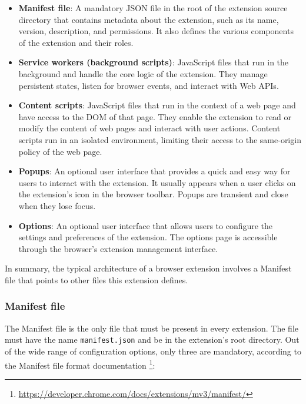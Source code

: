 \begin{itemize}
	\item \textbf{Manifest file}: A mandatory JSON file in the root of the extension source directory that contains metadata about the extension, such as its name, version, description, and permissions. It also defines the various components of the extension and their roles.
	\item \textbf{Service workers (background scripts)}: JavaScript files that run in the background and handle the core logic of the extension. They manage persistent states, listen for browser events, and interact with Web APIs.
	\item \textbf{Content scripts}: JavaScript files that run in the context of a web page and have access to the DOM of that page. They enable the extension to read or modify the content of web pages and interact with user actions. Content scripts run in an isolated environment, limiting their access to the same-origin policy of the web page.
	\item \textbf{Popups}: An optional user interface that provides a quick and easy way for users to interact with the extension. It usually appears when a user clicks on the extension's icon in the browser toolbar. Popups are transient and close when they lose focus.
	\item \textbf{Options}: An optional user interface that allows users to configure the settings and preferences of the extension. The options page is accessible through the browser's extension management interface.
\end{itemize}

In summary, the typical architecture of a browser extension involves a Manifest file that points to other files this extension defines.

\subsubsection{Manifest file}

The Manifest file is the only file that must be present in every extension. The file must have the name \texttt{manifest.json} and be in the extension's root directory. Out of the wide range of configuration options, only three are mandatory, according to the Manifest file format documentation \footnote{\url{https://developer.chrome.com/docs/extensions/mv3/manifest/}}:

